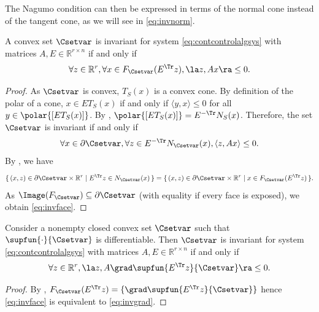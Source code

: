 \documentclass[11pt,twoside,a4paper,openright]{uclouvain-thesis}
\begin{document}
The Nagumo condition can then be expressed in terms of the normal cone instead of the tangent cone,
as we will see in \eqref{eq:invnorm}.


\begin{mytheo}
  \label{theo:invconvex}
  A convex set $\Csetvar$ is invariant for system \eqref{eq:contcontrolalgsys}
  with matrices $A, E \in \mathbb{R}^{r \times n}$
  if and only if
  \begin{equation}
    \label{eq:invface}
    \forall z \in \mathbb{R}^r, \forall x \in F_\Csetvar(E^\Tr z), \la z, Ax \ra \le 0.
  \end{equation}
  \begin{proof}
    As $\Csetvar$ is convex, $T_S(x)$ is a convex cone. By definition
    of the polar of a cone, $x \in ET_S(x)$ if and only if
    $\langle y, x \rangle \le 0$ for all $y \in \polar{[ET_S(x)]}$.
    By , $\polar{[ET_S(x)]} = E^{-\Tr}N_S(x)$.
    Therefore, the set $\Csetvar$ is invariant if and only if
    \begin{equation}
      \label{eq:invnorm}
      \forall x \in \partial \Csetvar, \forall z \in E^{-\Tr} N_\Csetvar(x), \langle z, Ax \rangle \le 0.
    \end{equation}
    By , we have
    \begin{multline*}
      \{\, (x, z) \in \partial \Csetvar \times \mathbb{R}^r \mid E^\Tr z \in N_\Csetvar(x) \,\} = %
      \{\, (x, z) \in \partial \Csetvar \times \mathbb{R}^r \mid x \in F_\Csetvar(E^\Tr z) \,\}.
    \end{multline*}
    As $\Image(F_\Csetvar) \subseteq \partial \Csetvar$ (with equality if every face is exposed),
    we obtain \eqref{eq:invface}.
  \end{proof}
\end{mytheo}

\begin{mytheo}
  \label{theo:invexposed}
  Consider a nonempty closed convex set $\Csetvar$ such that
  $\supfun{\cdot}{\Csetvar}$ is differentiable.
  Then $\Csetvar$ is invariant for system \eqref{eq:contcontrolalgsys}
  with matrices $A, E \in \mathbb{R}^{r \times n}$
  if and only if
  \begin{equation}
    \label{eq:invgrad}
    \forall z \in \mathbb{R}^r, \la z, A \grad \supfun{E^\Tr z}{\Csetvar} \ra \le 0.
  \end{equation}
  \begin{proof}
    By , $F_\Csetvar(E^\Tr z) = \{\grad \supfun{E^\Tr z}{\Csetvar}\}$
    hence \eqref{eq:invface} is equivalent to \eqref{eq:invgrad}.
  \end{proof}
\end{mytheo}
\end{document}
